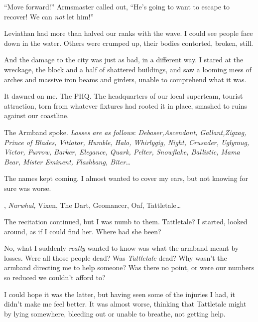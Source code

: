 ``Move forward!'' Armsmaster called out, ``He's going to want to escape to recover!  We can \emph{not }let him!''



Leviathan had more than halved our ranks with the wave.  I could see people face down in the water.  Others were crumped up, their bodies contorted, broken, still.



And the damage to the city was just as bad, in a different way.  I stared at the wreckage, the block and a half of shattered buildings, and saw a looming mess of arches and massive iron beams and girders, unable to comprehend what it was.



It dawned on me.  The PHQ.  The headquarters of our local superteam, tourist attraction, torn from whatever fixtures had rooted it in place, smashed to ruins against our coastline.



The Armband spoke.\emph{  Losses are as follows}:  \emph{Debaser,}\emph{Ascendant, Gallant,}\emph{Zigzag, Prince of Blades, Vitiator, Humble, Halo, Whirlygig, Night, Crusader, Uglymug, Victor, Furrow, Barker, Elegance, Quark, Pelter, Snowflake, Ballistic, Mama Bear, Mister Eminent, Flashbang, Biter\ldots}



The names kept coming.  I almost wanted to cover my ears, but not knowing for sure was worse.



\ldotsCloister, \emph{Narwhal,} Vixen, The Dart, Geomancer, Oaf, Tattletale\ldots



The recitation continued, but I was numb to them.  Tattletale?  I started, looked around, as if I could find her.  Where had she been?



No, what I suddenly \emph{really} wanted to know was what the armband meant by losses.  Were all those people dead?  Was \emph{Tattletale} dead?  Why wasn't the armband directing me to help someone?  Was there no point, or were our numbers so reduced we couldn't afford to?



I could hope it was the latter, but having seen some of the injuries I had, it didn't make me feel better.  It was almost worse, thinking that Tattletale might by lying somewhere, bleeding out or unable to breathe, not getting help.



